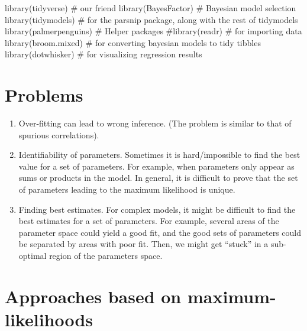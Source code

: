 \documentclass[
  letterpaper,
  DIV=11,
  numbers=noendperiod]{scrreprt}
\newenvironment{Shaded}{\begin{snugshade}}{\end{snugshade}}
\newcommand{\CommentTok}[1]{\textcolor[rgb]{0.37,0.37,0.37}{#1}}
\newcommand{\FunctionTok}[1]{\textcolor[rgb]{0.28,0.35,0.67}{#1}}
\newcommand{\NormalTok}[1]{\textcolor[rgb]{0.00,0.23,0.31}{#1}}
\begin{document}
\begin{Shaded}
\begin{Highlighting}[]
\FunctionTok{library}\NormalTok{(tidyverse) }\CommentTok{\# our friend }
\FunctionTok{library}\NormalTok{(BayesFactor) }\CommentTok{\# Bayesian model selection}
\FunctionTok{library}\NormalTok{(tidymodels)  }\CommentTok{\# for the parsnip package, along with the rest of tidymodels}
\FunctionTok{library}\NormalTok{(palmerpenguins)}
\CommentTok{\# Helper packages}
\CommentTok{\#library(readr)       \# for importing data}
\FunctionTok{library}\NormalTok{(broom.mixed) }\CommentTok{\# for converting bayesian models to tidy tibbles}
\FunctionTok{library}\NormalTok{(dotwhisker)  }\CommentTok{\# for visualizing regression results}
\end{Highlighting}
\end{Shaded}

\hypertarget{problems}{%
\section{Problems}\label{problems}}

\begin{enumerate}
\def\labelenumi{\arabic{enumi}.}
\item
  Over-fitting can lead to wrong inference. (The problem is similar to
  that of spurious correlations).
\item
  Identifiability of parameters. Sometimes it is hard/impossible to find
  the best value for a set of parameters. For example, when parameters
  only appear as sums or products in the model. In general, it is
  difficult to prove that the set of parameters leading to the maximum
  likelihood is unique.
\item
  Finding best estimates. For complex models, it might be difficult to
  find the best estimates for a set of parameters. For example, several
  areas of the parameter space could yield a good fit, and the good sets
  of parameters could be separated by areas with poor fit. Then, we
  might get ``stuck'' in a sub-optimal region of the parameters space.
\end{enumerate}

\hypertarget{approaches-based-on-maximum-likelihoods}{%
\section{Approaches based on
maximum-likelihoods}\label{approaches-based-on-maximum-likelihoods}}
\end{document}
